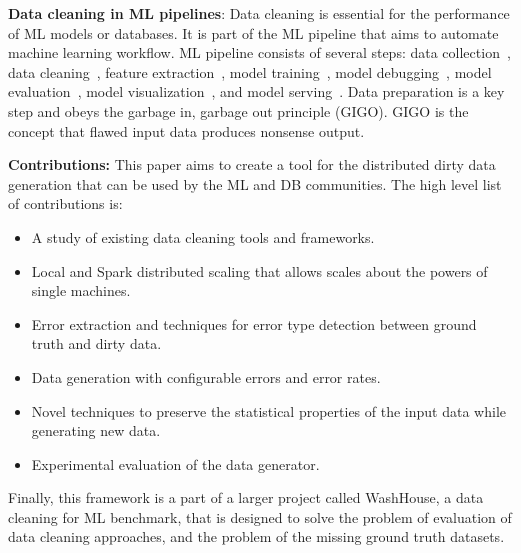 \textbf{Data cleaning in ML pipelines}: 
Data cleaning is essential for the performance of ML models or databases.
It is part of the ML pipeline that aims to automate machine learning workflow. 
ML pipeline consists of several steps: data collection~\cite{LiDLMS2015}, data cleaning~\cite{raha, baran, RekatsinasCIR2017, holodetect, activeclean, alphaclean, cleanml}, feature extraction~\cite{ShahLKYK2021}, model training~\cite{RekatsinasCIR2017}, model debugging~\cite{SagadeevaB2021}, model evaluation~\cite{generalizing_confusion_matrix}, model visualization~\cite{NakandalaKP2019, CrottyGZBK2015, SimonyanVZ2013}, and model serving~\cite{OlstonFGHLLRR2017, Lee2018, WeiGZWCNOSR2018}.
Data preparation is a key step and obeys the garbage in, garbage out principle (GIGO).
GIGO is the concept that flawed input data produces nonsense output.

\textbf{Contributions:} 
This paper aims to create a tool for the distributed dirty data generation that can be used by the ML and DB communities. 
The high level list of contributions is:

\begin{itemize}
    \item A study of existing data cleaning tools and frameworks.
    \item Local and Spark distributed scaling that allows scales about the powers of single machines.
    \item Error extraction and techniques for error type detection between ground truth and dirty data.
    \item Data generation with configurable errors and error rates.
    \item Novel techniques to preserve the statistical properties of the input data while generating new data.
    \item Experimental evaluation of the data generator.
\end{itemize}

Finally, this framework is a part of a larger project called WashHouse, a data cleaning for ML benchmark, that is designed to solve the problem of evaluation of data cleaning approaches, and the problem of the missing ground truth datasets.


